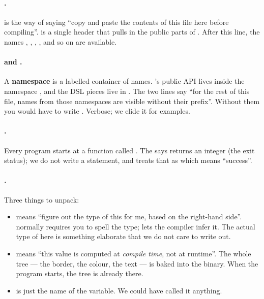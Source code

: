 \paragraph{.}
 is the \cpp{} way of saying ``copy and paste the
contents of this file here before compiling''.  is
a single header that pulls in the public parts of \maya{}. After this
line, the names , , , , and so
on are available.

\paragraph{ and .}
A \textbf{namespace} is a labelled container of names. \maya{}'s
public API lives inside the namespace , and the DSL pieces
live in . The two  lines say
``for the rest of this file, names from those namespaces are visible
without their prefix''. Without them you would have to write
. Verbose; we elide it for
examples.

\paragraph{.}
Every \cpp{} program starts at a function called . The
 says  returns an integer (the exit status); we
do not write a  statement, and \cpp{} treats that as
 which means ``success''.

\paragraph{.}
Three things to unpack:
\begin{itemize}[leftmargin=*]
  \item {} means ``figure out the type of this for me, based
    on the right-hand side''. \cpp{} normally requires you to spell
    the type;  lets the compiler infer it. The actual type
    of  here is something elaborate that we do not care to
    write out.
  \item {} means ``this value is computed at
    \emph{compile time}, not at runtime''. The whole tree --- the
    border, the colour, the text --- is baked into the binary. When
    the program starts, the tree is already there.
  \item {} is just the name of the variable. We could have
    called it anything.
\end{itemize}

